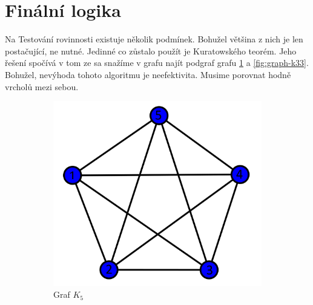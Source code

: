 \section{Finální logika}

Na Testování rovinnosti existuje několik podmínek.
Bohužel většina z nich je len postačující, ne nutné.
Jedinné co zůstalo použít je Kuratowského teorém. Jeho řešení spočívá v tom ze sa snažíme v grafu najít podgraf grafu
\ref{fig:graph-k5} a \ref{fig:graph-k33}. Bohužel, nevýhoda tohoto algoritmu je neefektivita. Musime porovnat hodně vrcholů mezi sebou.

\begin{figure}[h]
    \centering
    \begin{subfigure}[b]{0.4\textwidth}
        \centering
        \includegraphics[width=\textwidth]{doc/fig/K5.png}
        \caption{Graf $K_5$}
        \label{fig:graph-k5}
    \end{subfigure}
    \hfill
    \begin{subfigure}[b]{0.3\textwidth}
        \centering

\end{subfigure}
\end{figure}
